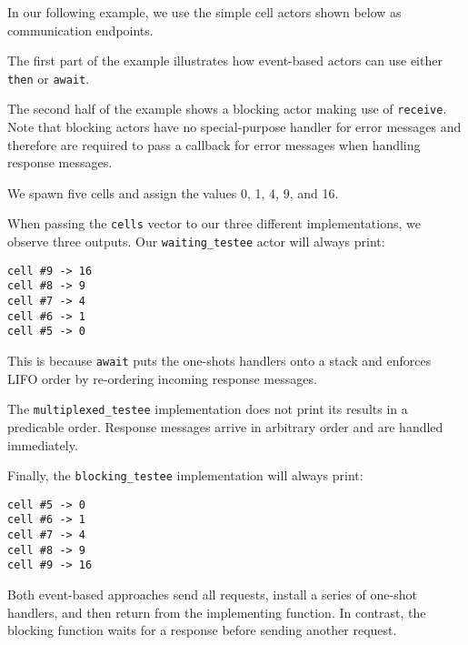 In our following example, we use the simple cell actors shown below as communication endpoints.



The first part of the example illustrates how event-based actors can use either \lstinline^then^ or \lstinline^await^.



\clearpage
The second half of the example shows a blocking actor making use of \lstinline^receive^. Note that blocking actors have no special-purpose handler for error messages and therefore are required to pass a callback for error messages when handling response messages.



We spawn five cells and assign the values 0, 1, 4, 9, and 16.



When passing the \lstinline^cells^ vector to our three different implementations, we observe three outputs. Our \lstinline^waiting_testee^ actor will always print:

{\footnotesize\begin{verbatim}
cell #9 -> 16
cell #8 -> 9
cell #7 -> 4
cell #6 -> 1
cell #5 -> 0
\end{verbatim}}

This is because \lstinline^await^ puts the one-shots handlers onto a stack and enforces LIFO order by re-ordering incoming response messages.

The \lstinline^multiplexed_testee^ implementation does not print its results in a predicable order. Response messages arrive in arbitrary order and are handled immediately.

Finally, the \lstinline^blocking_testee^ implementation will always print:

{\footnotesize\begin{verbatim}
cell #5 -> 0
cell #6 -> 1
cell #7 -> 4
cell #8 -> 9
cell #9 -> 16
\end{verbatim}}

Both event-based approaches send all requests, install a series of one-shot handlers, and then return from the implementing function. In contrast, the blocking function waits for a response before sending another request.

